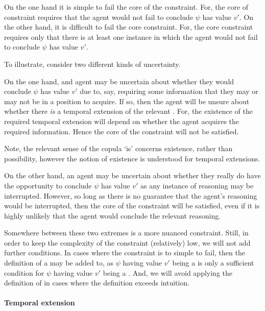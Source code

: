 \begin{note}[Delicacy]
  On the one hand it is simple to fail the core of the constraint.
  For, the core of constraint requires that the agent would not fail to conclude \(\psi\) has value \(v'\).
  On the other hand, it is difficult to fail the core constraint.
  For, the core constraint requires only that there is at least one instance in which the agent would not fail to conclude \(\psi\) has value \(v'\).

  To illustrate, consider two different kinds of uncertainty.

  On the one hand, and agent may be uncertain about whether they would conclude \(\psi\) has value \(v'\) due to, say, requiring some information that they may or may not be in a position to acquire.
  If so, then the agent will be unsure about whether there \emph{is} a temporal extension of the relevant \world{}.
  For, the existence of the required temporal extension will depend on whether the agent acquires the required information.
  Hence the core of the constraint will not be satisfied.

  Note, the relevant sense of the copula `is' concerns existence, rather than possibility, however the notion of existence is understood for temporal extensions.

  On the other hand, an agent may be uncertain about whether they really do have the opportunity to conclude \(\psi\) has value \(v'\) as any instance of reasoning may be interrupted.
  However, so long as there is no guarantee that the agent's reasoning would be interrupted, then the core of the constraint will be satisfied, even if it is highly unlikely that the agent would conclude the relevant reasoning.

  Somewhere between these two extremes is a more nuanced constraint.
  Still, in order to keep the complexity of the constraint (relatively) low, we will not add further conditions.
  In cases where the constraint is to simple to fail, then the definition of a \requ{} may be added to, as \(\psi\) having value \(v'\) being a \prequ{} is only a sufficient condition for \(\psi\) having value \(v'\) being a \requ{}.
  And, we will avoid applying the definition of \prequ{} in cases where the definition exceeds intuition.
\end{note}

\paragraph{Temporal extension}

